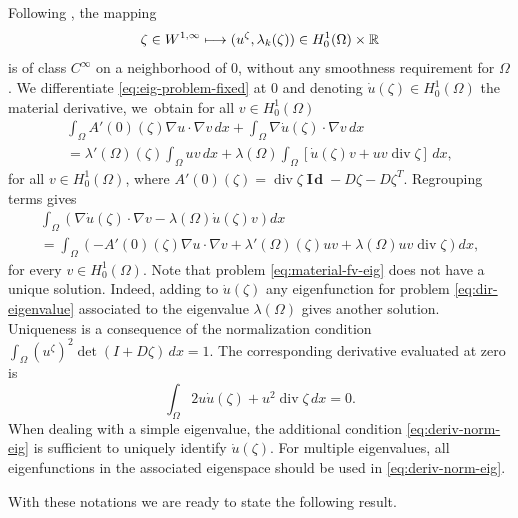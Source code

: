 \documentclass[JEP,XML,SOM,Unicode,ThmDefs,NoFloatCountersInSection,published]{cedram}
\def\mto{\mathchoice{\longmapsto}{\mapsto}{\mapsto}{\mapsto}}
\theoremstyle{plain}
\theoremstyle{definition}
\newcommand{\di}{\operatorname{div}}
\newcommand{\bo}[1]{{\boldsymbol#1}}
\newcommand{\Id}{\operatorname{{\bo I\!\bo d}}}
\let\Bbb\mathbb
\begin{document}
Following \cite[Th.\,5.7.4 ]{henrot-pierre-english}, the mapping
\[
\zeta \in W^{1,\infty} \mto (u^\zeta, \lambda_k(\zeta)) \in H_0^1(\Omega)\times \Bbb{R}
\]
is of class $C^\infty$ on a neighborhood of $0$, without any smoothness requirement for $\Omega$. We differentiate \eqref{eq:eig-problem-fixed} at $0$ and denoting $\dot u(\zeta) \in H_0^1(\Omega)$ the material derivative, we~obtain for all $v \in H_0^1(\Omega)$
\vspace*{-5pt}
\begin{multline*}
\int_\Omega A'(0)(\zeta)\nabla u \cdot \nabla v \, dx +\int_\Omega \nabla \dot u(\zeta)\cdot \nabla v \, dx \\
= \lambda'(\Omega)(\zeta) \int_\Omega uv\, dx +\lambda(\Omega)\int_\Omega [\dot u(\zeta)v +uv\di \zeta]\, dx,
\end{multline*}
for all $v \in H_0^1(\Omega)$, where $A'(0)(\zeta) = \di \zeta \Id - D\zeta-D\zeta^T$. Regrouping terms gives
\vspace*{-5pt}
\begin{multline}
\int_\Omega \left(\nabla \dot u(\zeta)\cdot \nabla v -\lambda(\Omega) \dot u(\zeta)v\right)dx \\
= \int_\Omega\left(- A'(0)(\zeta)\nabla u \cdot \nabla v + \lambda'(\Omega)(\zeta) uv+\lambda(\Omega) uv\di \zeta\right) dx,
\label{eq:material-fv-eig}
\end{multline}
for every $v \in H_0^1(\Omega)$.
Note that problem \eqref{eq:material-fv-eig} does not have a unique solution. Indeed, adding to $\dot u(\zeta)$ any eigenfunction for problem \eqref{eq:dir-eigenvalue} associated to the eigenvalue $\lambda(\Omega)$ gives another solution. Uniqueness is a consequence of the normalization condition $\int_\Omega (u^\zeta)^2 \det(I+D\zeta)\, dx=1$. The corresponding derivative evaluated at zero is
\begin{equation}
\int_\Omega 2u\dot u(\zeta)+u^2 \di \zeta \, dx = 0.
\label{eq:deriv-norm-eig}
\end{equation}
When dealing with a simple eigenvalue, the additional condition \eqref{eq:deriv-norm-eig} is sufficient to uniquely identify $\dot u(\zeta)$. For multiple eigenvalues, all eigenfunctions in the associated eigenspace should be used in \eqref{eq:deriv-norm-eig}.

With these notations we are ready to state the following result.
\end{document}
